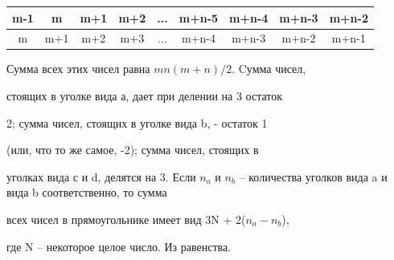 \begin{multicols}{2}
\begin{center}
\begin{tabular}{|c|c|c|c|c|c|c|c|c|}
\hline

m-1&m&m+1&m+2&...&m+n-5&m+n-4&m+n-3&m+n-2\\

\hline

m & m+1 & m+2 & m+3 & ... & m+n-4 & m+n-3 & m+n-2 & m+n-1 \\

\hline

\end{tabular}

\end{center}

Сумма всех этих чисел равна $mn(m+n)/2$. Cумма чисел,

стоящих в уголке вида а, дает при делении на 3 остаток

2; сумма чисел, стоящих в уголке вида b, - остаток 1

(или, что то же самое, -2); сумма чисел, стоящих в

уголках вида с и d, делятся на 3. Если $n_a$ и $n_b$ – количества уголков вида a и вида b соответственно, то сумма

всех чисел в прямоугольнике имеет вид 3N + 2($n_a-n_b$),

где N – некоторое целое число. Из равенства.

\end{multicols}